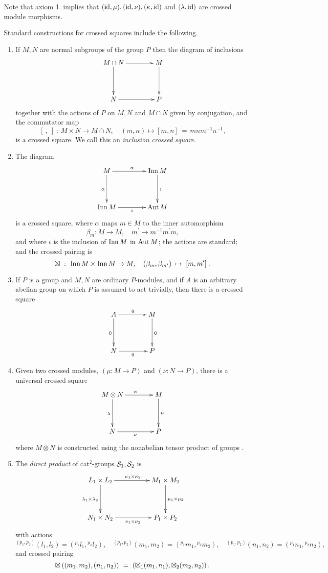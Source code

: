 \documentclass[a4paper,11pt]{article}
\theoremstyle{plain}
\theoremstyle{definition}
\begin{document}
\noindent 
Note that axiom 1. implies that $(\mathrm{id},\mu), (\mathrm{id},\nu), (\kappa,\mathrm{id})$ 
and $(\lambda,\mathrm{id})$ are crossed module morphisms. 

\medskip 
\noindent 
Standard constructions for crossed squares include the following.
\begin{enumerate}
\item 
If $M,N$ are normal subgroups of the group $P$ then the diagram of inclusions
\[
\xymatrix@R=40pt@C=40pt
{ M \cap N \ar[r]^(0.6){} \ar[d]_{}  
	& M \ar[d]^{} \\
	N \ar[r]_{}  
	& P }
\] 
\noindent together with the actions of $P$ on $M,N$ and $M\cap N$ 
given by conjugation, and the commutator map 
\[
[~,~] ~:~ M\times N \rightarrow M\cap N,\quad 
(m,n)\mapsto [m,n] \,=\, mnm^{-1}n^{-1}, 
\] 
is a crossed square. 
We call this an \emph{inclusion crossed square}.
\item 
The diagram
\[
\xymatrix@R=40pt@C=40pt
{ M \ar[r]^{\alpha} \ar[d]_{\alpha} 
	& \Inn\,M \ar[d]^{\iota} \\
	\Inn\,M \ar[r]_{\iota} 
	& \Aut\,M }
\] 
\noindent is a crossed square, 
where $\alpha $ maps $m\in M$ to the inner automorphism%
\[
\beta_{m} : M \rightarrow M,\quad 
m^{\prime}\mapsto m^{-1}m^{\prime}m, 
\]
and where $\iota $ is the inclusion of $\mathrm{Inn}\,M$ in $\mathrm{Aut}\,M$; 
the actions are standard; and the crossed pairing is
\[
\boxtimes ~:~ \mathrm{Inn}\,M \times \mathrm{Inn}\,M \rightarrow M,\quad 
(\beta_{m},\beta_{m^{\prime}}) \;\mapsto\; [m,m^{\prime}]~.
\]
\item 
If $P$ is a group and $M,N$ are ordinary $P$-modules, 
and if $A$ is an arbitrary abelian group on which $P$ is assumed to act trivially, 
then there is a crossed square
\[
\xymatrix@R=40pt@C=40pt
{ A \ar[r]^{0} \ar[d]_{0}  
	& M \ar[d]^{0} \\
	N \ar[r]_{0} 
	& P }
\]
\item 
Given two crossed modules, $(\mu : M \rightarrow P)$ and $(\nu : N \rightarrow P)$, 
there is a universal crossed square 
\[
\xymatrix@R=40pt@C=40pt
{ M \otimes N \ar[d]_{\lambda} \ar[r]^{\kappa} 
	& M \ar[d]^{\mu} \\ 
	N \ar[r]_{\nu} 
	& P } 
\] 
where $M \otimes N$ is constructed using the nonabelian tensor product of groups 
\cite{brown-loday}. 
\item
The \emph{direct product} of cat$^2$-groups $\mathcal{S}_1,\mathcal{S}_2$ is 
\[
\xymatrix@R=40pt@C=50pt
{ L_1 \times L_2 \ar[r]^{\kappa_1 \times \kappa_2} 
                 \ar[d]_{\lambda_1 \times \lambda_2}  
	& M_1 \times M_2 \ar[d]^{\mu_1 \times \mu_2} \\
	N_1 \times N_2 \ar[r]_{\nu_1 \times \nu_2} 
	& P_1 \times P_2 }
\] 
with actions 
\[
{}^{(p_1,p_2)}(l_1,l_2) = \left({}^{p_1}l_1,{}^{p_2}l_2\right), \quad 
{}^{(p_1,p_2)}(m_1,m_2) = \left({}^{p_1}m_1,{}^{p_2}m_2\right), \quad 
{}^{(p_1,p_2)}(n_1,n_2) = \left({}^{p_1}n_1,{}^{p_2}n_2\right),  
\]
and crossed pairing 
\[
\boxtimes\left((m_1,m_2),(n_1,n_2)\right) ~=~ \left(\boxtimes_1(m_1,n_1),\boxtimes_2(m_2,n_2)\right). 
\]
\end{enumerate}
\end{document}
